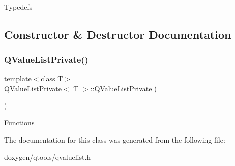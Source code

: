Typedefs 

\subsection{Constructor \& Destructor Documentation}
\mbox{\label{class_q_value_list_private_a4bc6b1cd9fef45a3d1915efcc871d908}} 
\subsubsection{\texorpdfstring{QValueListPrivate()}{QValueListPrivate()}}
{\footnotesize\ttfamily template$<$class T$>$ \\
\mbox{\hyperlink{class_q_value_list_private}{Q\+Value\+List\+Private}}$<$ T $>$\+::\mbox{\hyperlink{class_q_value_list_private}{Q\+Value\+List\+Private}} (\begin{DoxyParamCaption}{ }\end{DoxyParamCaption})\hspace{0.3cm}{\ttfamily [inline]}}

Functions 

The documentation for this class was generated from the following file\+:\begin{DoxyCompactItemize}
\item 
doxygen/qtools/qvaluelist.\+h\end{DoxyCompactItemize}
